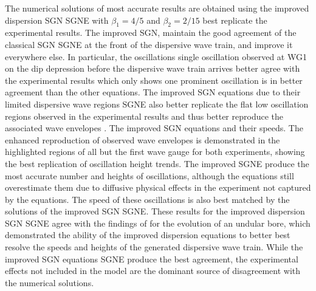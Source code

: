 \documentclass[10pt]{elsarticle}
\providecommand{\DIFaddtex}[1]{{\protect\color{blue} \sf #1}} %
\providecommand{\DIFdeltex}[1]{{\protect\color{red} \scriptsize #1}} %
\providecommand{\DIFaddbegin}{} %
\providecommand{\DIFaddend}{} %
\providecommand{\DIFdelbegin}{} %
\providecommand{\DIFdelend}{} %
\providecommand{\DIFadd}[1]{\texorpdfstring{\DIFaddtex{#1}}{#1}} %
\providecommand{\DIFdel}[1]{\texorpdfstring{\DIFdeltex{#1}}{}} %
\newcommand{\DIFscaledelfig}{0.5}
\newlength{\DIFdelgraphicswidth} %
\newlength{\DIFdelgraphicsheight} %
\newcommand{\DIFaddincludegraphics}[2][]{{\color{blue}\fbox{\DIFOincludegraphics[#1]{#2}}}} %
\newcommand{\DIFdelincludegraphics}[2][]{%
\sbox{\DIFdelgraphicsbox}{\DIFOincludegraphics[#1]{#2}}%
\settoboxwidth{\DIFdelgraphicswidth}{\DIFdelgraphicsbox} %
\settoboxtotalheight{\DIFdelgraphicsheight}{\DIFdelgraphicsbox} %
\scalebox{\DIFscaledelfig}{%
\parbox[b]{\DIFdelgraphicswidth}{\usebox{\DIFdelgraphicsbox}\\[-\baselineskip] \rule{\DIFdelgraphicswidth}{0em}}\llap{\resizebox{\DIFdelgraphicswidth}{\DIFdelgraphicsheight}{%
\setlength{\unitlength}{\DIFdelgraphicswidth}%
\begin{picture}(1,1)%
\thicklines\linethickness{2pt} %
{\color[rgb]{1,0,0}\put(0,0){\framebox(1,1){}}}%
{\color[rgb]{1,0,0}\put(0,0){\line( 1,1){1}}}%
{\color[rgb]{1,0,0}\put(0,1){\line(1,-1){1}}}%
\end{picture}%
}\hspace*{3pt}}} %
} %
\DeclareRobustCommand{\DIFaddbegin}{\DIFOaddbegin \let\includegraphics\DIFaddincludegraphics} %
\DeclareRobustCommand{\DIFaddend}{\DIFOaddend \let\includegraphics\DIFOincludegraphics} %
\DeclareRobustCommand{\DIFdelbegin}{\DIFOdelbegin \let\includegraphics\DIFdelincludegraphics} %
\DeclareRobustCommand{\DIFdelend}{\DIFOaddend \let\includegraphics\DIFOincludegraphics} %
\begin{document}
The \DIFdelbegin \DIFdel{numerical solutions of }\DIFdelend \DIFaddbegin \DIFadd{most accurate results are obtained using }\DIFaddend the improved dispersion \DIFdelbegin \DIFdel{SGN }\DIFdelend \DIFaddbegin \DIFadd{SGNE }\DIFaddend with $\beta_1 = 4/5$ and $\beta_2 = 2/15$\DIFdelbegin \DIFdel{best replicate the experimental results}\DIFdelend . The improved SGN, maintain the good agreement of the classical \DIFdelbegin \DIFdel{SGN }\DIFdelend \DIFaddbegin \DIFadd{SGNE }\DIFaddend at the front of the dispersive wave train, and improve it everywhere else. In particular, the \DIFdelbegin \DIFdel{oscillations }\DIFdelend \DIFaddbegin \DIFadd{single oscillation }\DIFaddend observed at WG1 on the \DIFdelbegin \DIFdel{dip }\DIFdelend \DIFaddbegin \DIFadd{depression }\DIFaddend before the dispersive wave train arrives \DIFdelbegin \DIFdel{better agree with the experimental results which only shows one prominent oscillation}\DIFdelend \DIFaddbegin \DIFadd{is in better agreement than the other equations}\DIFaddend . The improved \DIFdelbegin \DIFdel{SGN equations due to their limited dispersive wave regions }\DIFdelend \DIFaddbegin \DIFadd{SGNE also }\DIFaddend better replicate the \DIFdelbegin \DIFdel{flat }\DIFdelend \DIFaddbegin \DIFadd{low oscillation }\DIFaddend regions observed in the experimental results and thus better reproduce the associated wave envelopes \DIFdelbegin \DIFdel{. The improved SGN equations }\DIFdelend \DIFaddbegin \DIFadd{and their speeds. The enhanced reproduction of observed wave envelopes is demonstrated in the highlighted regions of all but the first wave gauge for both experiments, showing the best replication of oscillation height trends. The improved SGNE }\DIFaddend produce the most accurate number and heights of oscillations, although the equations still overestimate them due to diffusive physical effects \DIFaddbegin \DIFadd{in the experiment }\DIFaddend not captured by the equations. The speed of these oscillations is also best matched by the solutions of the improved \DIFdelbegin \DIFdel{SGN}\DIFdelend \DIFaddbegin \DIFadd{SGNE}\DIFaddend . These results for the improved dispersion \DIFdelbegin \DIFdel{SGN }\DIFdelend \DIFaddbegin \DIFadd{SGNE }\DIFaddend agree with the findings of \citet{DoCarmo-2018} for the evolution of an undular bore, which demonstrated the ability of \DIFaddbegin \DIFadd{the }\DIFaddend improved dispersion equations to \DIFdelbegin \DIFdel{better }\DIFdelend \DIFaddbegin \DIFadd{best }\DIFaddend resolve the speeds and heights of the generated dispersive wave train. While the improved \DIFdelbegin \DIFdel{SGN equations }\DIFdelend \DIFaddbegin \DIFadd{SGNE }\DIFaddend produce the best agreement, the experimental effects not included in the model are the dominant source of disagreement with \DIFdelbegin \DIFdel{the }\DIFdelend numerical solutions.
\end{document}
